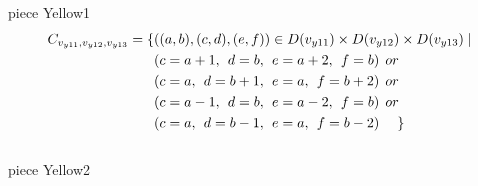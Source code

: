  piece Yellow1
\begin{align*}
C_{v_{y11},v_{y12},v_{y13}}=\{&((a,b),(c,d),(e,f))\in D(v_{y11})\times D(v_{y12})\times D(v_{y13})\mid\\
&(c = a + 1,\hspace{1ex}d = b,\hspace{1ex}e = a + 2, \hspace{1ex}f = b)\hspace{1ex} or\\
&(c = a,\hspace{1ex}d = b+1,\hspace{1ex}e = a, \hspace{1ex}f = b+2)\hspace{1ex} or\\
&(c = a-1,\hspace{1ex}d = b,\hspace{1ex}e = a-2,\hspace{1ex} f = b)\hspace{1ex} or\\
&(c = a,\hspace{1ex}d = b-1,\hspace{1ex}e = a, \hspace{1ex}f = b-2)\hspace{3ex} \}
\end{align*} 
\\ piece Yellow2
